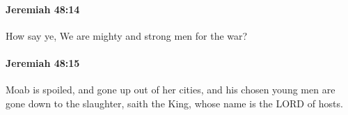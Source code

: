 		\paragraph{Jeremiah 48:14} %
			\label{JEREMIAH-48-14}

			How say ye, We are mighty and strong men for the war?


		\paragraph{Jeremiah 48:15} %
			\label{JEREMIAH-48-15}

			Moab is spoiled, and gone up out of her cities, and his chosen young men are gone down to the slaughter, saith the King, whose name is the LORD of hosts.


